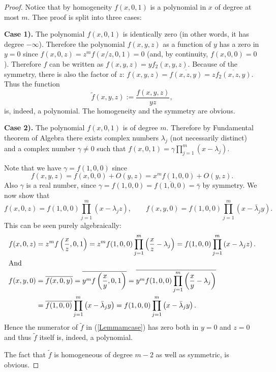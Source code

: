 \documentclass[10pt,a4paper,reqno]{amsart}
\newcommand{\zav}[1]{\left( #1 \right)}
\begin{document}
\begin{proof} 
Notice that by homogeneity $f(x,0,1)$ is a polynomial in $x$ of degree at most $m$. Thee proof is split into three cases:
\bigskip

\textbf{Case 1).} The polynomial $f(x,0,1)$ is identically zero (in other words, it has degree $-\infty$). Therefore the polynomial $f(x,y,z)$ as a function of $y$ has a zero in $y=0$ since $f(x,0,z)=z^m f\zav{x/z,0,1}=0$ (and, by continuity, $f(x,0,0)=0$). Therefore $f$ can be written as $f(x,y,z)=y f_2(x,y,z)$. Because of the symmetry, there is also the factor of $z$: $f(x,y,z)=\overline{f(x,z,y)}=z\overline{f_2(x,z,y)}$. Thus the function
$$
\tilde f(x,y,z):=\frac{f(x,y,z)}{yz},
$$  
is, indeed, a polynomial. The homogeneity and the symmetry are obvious.
\bigskip

\textbf{Case 2).} The polynomial $f(x,0,1)$ is of degree $m$. Therefore by Fundamental theorem of Algebra there exists complex numbers $\lambda_j$ (not necessarily distinct) and a complex number $\gamma\not=0$ such that $f(x,0,1)=\gamma \prod_{j=1}^m(x- \lambda_j) $. 
 
Note that we have $\gamma=f(1,0,0)$ since 
$$
f(x,y,z)=f(x,0,0)+O(y,z)=x^mf(1,0,0)+O(y,z).
$$ 
Also $\gamma$ is a real number, since $\gamma=f(1,0,0)=\overline{f(1,0,0)}=\bar \gamma$ by symmetry.
We now show that 
$$
f(x,0,z)=f(1,0,0)\prod_{j=1}^m\zav{x-\lambda_j z},\qquad
f(x,y,0)=f(1,0,0)\prod_{j=1}^m\zav{x-\bar\lambda_j y}.
$$
This can be seen purely algebraically:
\begin{align*}
f(x,0,z)&=z^m f\zav{\frac{x}{z},0,1}=z^m f(1,0,0)\prod_{j=1}^m\zav{\frac{x}{z}-\lambda_j}=f(1,0,0)\prod_{j=1}^m\zav{x-\lambda_j z}.\\
\intertext{And}
f(x,y,0)&=\overline{f(x,0,y)}=\overline{y^mf\zav{\frac{x}{y},0,1}}= \overline{y^m f(1,0,0)\prod_{j=1}^m\zav{\frac{x}{y}-\lambda_j}}\\
&=
\overline{f(1,0,0)}\prod_{j=1}^m \zav{x-\bar \lambda_j y}=f(1,0,0)\prod_{j=1}^m \zav{x-\bar \lambda_j y}.
\end{align*}
Hence the numerator of $\tilde f$ in (\ref{Lemmamcase}) has zero both in $y=0$ and $z=0$ and thus $\tilde f$ itself is, indeed, a polynomial. 

The fact that $\tilde f$ is homogeneous of degree $m-2$ as well as symmetric, is obvious.
\bigskip


\end{proof}
\end{document}
